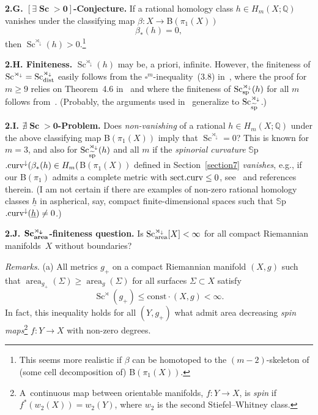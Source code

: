 \documentclass[10pt,a4paper]{amsart}
\numberwithin{equation}{section}
\begin{document}
 \textbf {2.G. $\boldsymbol{[\exists \operatorname{Sc}>0]}$-Conjecture.} If a rational homology class $h\in H_m(X;\mathbb Q)$ vanishes under the
 classifying map $ \beta\colon X\to ${\sf B}$(\pi_1(X))$
\[
\beta_\ast (h)=0,
\]
 then $\operatorname{Sc}^{\rtimes_\downarrow}(h) >0$.\footnote{This seems more realistic if $\beta$ can be
homotoped to the $(m-2)$-skeleton of (some cell decomposition of) $ ${\sf B}$(\pi_1(X))$.}

\textbf {2.H. Finiteness.} $ \operatorname{Sc}^{\rtimes_\downarrow}(h)$ may be, a priori, infinite. However, the finiteness of $\operatorname{Sc}^{\rtimes_\downarrow}=\operatorname{Sc}^{\rtimes_\downarrow}_{\rm dist}$ easily follows from
 the $\square^m$-inequality~(3.8) in~\cite{Gr2021}, where the
 proof for $m\geq 9$ relies on Theorem~4.6 in~\cite{SY2017} and
 where the finiteness of $ \operatorname{Sc}_{\rm sp} ^{\rtimes_\downarrow}(h)$
 for all $m$ follows from~\cite{WXY2021}.
 (Probably, the arguments used in~\cite{WXY2021} generalize to $ \operatorname{Sc}_{\widetilde{\rm sp}} ^{\rtimes_\downarrow}$.)

 \textbf{2.I. $\boldsymbol{\nexists \operatorname{Sc}>0}$-Problem.}
 Does {\it non-vanishing} of a rational $h\in H_m(X;\mathbb Q)$ under the above classifying map {\sf B}$ (\pi_1(X))$
 imply that
$\operatorname{Sc} ^{\rtimes_\downarrow}=0$?
 This is known for $m=3$, and also for
 $\operatorname{Sc} ^{\rtimes_\downarrow}_{\widetilde{\rm sp}}(h)$ and all $m$ if the {\it spinorial curvature} $\mathbb S${\sf p}$.{\rm curv}^\downarrow(\beta_\ast(h)\in H_m(${\sf B}$(\pi_1(X))$
 defined in Section~\ref{section7} {\it vanishes}, e.g., if our {\sf B}$(\pi_1)$ admits a complete metric with ${\rm sect.curv}\leq 0$, see~\cite{Gr2021} and references therein.
 (I am not certain if there are examples of non-zero rational homology classes $\underline h$ in aspherical, say, compact finite-dimensional spaces such that $\mathbb S${\sf p}$.{\rm curv}^\downarrow(\underline h)\neq 0$.)

 \textbf {2.J. $\boldsymbol{\operatorname{Sc}_{\rm area}^{\rtimes_\downarrow}}$-finiteness question.} Is
$\operatorname{Sc}_{\rm area}^{\rtimes_\downarrow}[X]<\infty$
 for all compact Riemannian manifolds~$X$ without boundaries?

{\it Remarks.} (a) All metrics $g_+$ on a compact Riemannian
 manifold $(X,g)$ such that $\operatorname{area}_{g_+}(\Sigma) \geq \operatorname{area}_{g}(\Sigma)$ for all surfaces $\Sigma \subset X$ satisfy
\[
\operatorname{Sc}^\rtimes (g_+)\leq \mathrm{const}\cdot (X,g)<\infty.
\]
 In fact, this inequality holds for all $(Y, g_+)$ what admit area decreasing {\it spin maps}\footnote{A~continuous map between orientable manifolds, $f\colon Y\to X$, is \emph{spin} if $f^\ast(w_2(X))=w_2(Y)$, where $w_2$ is the second Stiefel--Whitney class.}
 $f\colon Y\to X$ with non-zero degrees.
\end{document}
